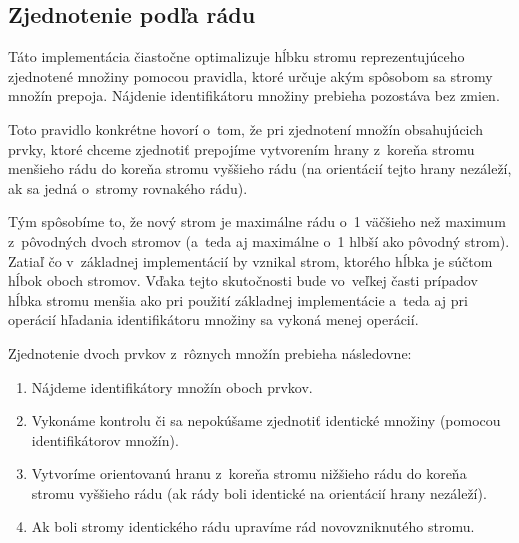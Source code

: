 \subsection{Zjednotenie podľa rádu}

Táto implementácia čiastočne optimalizuje hĺbku stromu reprezentujúceho zjednotené množiny pomocou pravidla, ktoré určuje akým spôsobom sa stromy množín prepoja. Nájdenie identifikátoru množiny prebieha pozostáva bez zmien.

Toto pravidlo konkrétne hovorí o~tom, že pri zjednotení množín obsahujúcich prvky, ktoré chceme zjednotiť prepojíme vytvorením hrany z~koreňa stromu menšieho rádu do koreňa stromu vyššieho rádu (na orientácií tejto hrany nezáleží, ak sa jedná o~stromy rovnakého rádu). 

Tým spôsobíme to, že nový strom je maximálne rádu o~1 väčšieho než maximum z~pôvodných dvoch stromov (a~teda aj maximálne o~1 hlbší ako pôvodný strom). Zatiaľ čo v~základnej implementácií by vznikal strom, ktorého hĺbka je súčtom hĺbok oboch stromov. Vďaka tejto skutočnosti bude vo~veľkej časti prípadov hĺbka stromu menšia ako pri použití základnej implementácie a~teda aj pri operácií hľadania identifikátoru množiny sa vykoná menej operácií.

Zjednotenie dvoch prvkov z~rôznych množín prebieha následovne:

\begin{enumerate}
    \item Nájdeme identifikátory množín oboch prvkov.
    \item Vykonáme kontrolu či sa nepokúšame zjednotiť identické množiny (pomocou identifikátorov množín).
    \item Vytvoríme orientovanú hranu z~koreňa stromu nižšieho rádu do koreňa stromu vyššieho rádu (ak rády boli identické na orientácií hrany nezáleží).
    \item Ak boli stromy identického rádu upravíme rád novovzniknutého stromu.
\end{enumerate}

